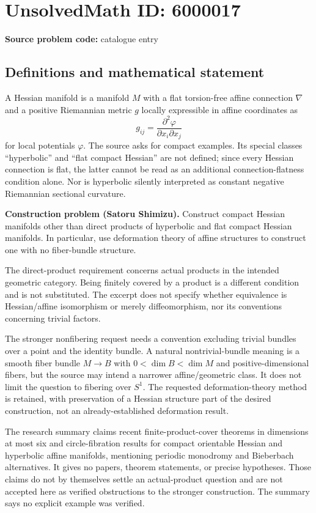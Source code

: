\documentclass[11pt]{article}
\begin{document}
\section*{UnsolvedMath ID: 6000017}
\textbf{Source problem code:} catalogue entry
\subsection{Definitions and mathematical statement}
A Hessian manifold is a manifold $M$ with a flat torsion-free affine connection $\nabla$ and a positive Riemannian metric $g$ locally expressible in affine coordinates as
\[
 g_{ij}=\frac{\partial^2\varphi}{\partial x_i\partial x_j}
\]
for local potentials $\varphi$. The source asks for compact examples. Its special classes ``hyperbolic'' and ``flat compact Hessian'' are not defined; since every Hessian connection is flat, the latter cannot be read as an additional connection-flatness condition alone. Nor is hyperbolic silently interpreted as constant negative Riemannian sectional curvature.

\textbf{Construction problem (Satoru Shimizu).} Construct compact Hessian manifolds other than direct products of hyperbolic and flat compact Hessian manifolds. In particular, use deformation theory of affine structures to construct one with no fiber-bundle structure.

The direct-product requirement concerns actual products in the intended geometric category. Being finitely covered by a product is a different condition and is not substituted. The excerpt does not specify whether equivalence is Hessian/affine isomorphism or merely diffeomorphism, nor its conventions concerning trivial factors.

The stronger nonfibering request needs a convention excluding trivial bundles over a point and the identity bundle. A natural nontrivial-bundle meaning is a smooth fiber bundle $M\to B$ with $0<\dim B<\dim M$ and positive-dimensional fibers, but the source may intend a narrower affine/geometric class. It does not limit the question to fibering over $S^1$. The requested deformation-theory method is retained, with preservation of a Hessian structure part of the desired construction, not an already-established deformation result.

The research summary claims recent finite-product-cover theorems in dimensions at most six and circle-fibration results for compact orientable Hessian and hyperbolic affine manifolds, mentioning periodic monodromy and Bieberbach alternatives. It gives no papers, theorem statements, or precise hypotheses. Those claims do not by themselves settle an actual-product question and are not accepted here as verified obstructions to the stronger construction. The summary says no explicit example was verified.
\end{document}
